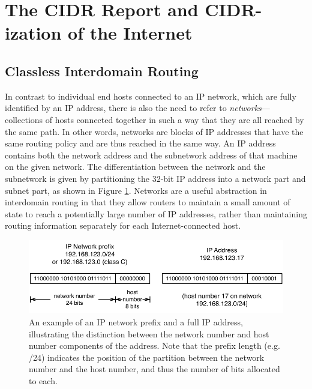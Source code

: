 %
%
%

\section{The CIDR Report and CIDR-ization of the Internet}


\subsection{Classless Interdomain Routing}

In contrast to individual end hosts connected to an IP network, which are fully
identified by an IP address, there is also the need to refer to
\emph{networks}---collections of hosts connected together in such a way that
they are all reached by the same path. In other words, networks are blocks of
IP addresses that have the same routing policy and are thus reached in the same
way. An IP address contains both the network address and the subnetwork address
of that machine on the given network. The differentiation between the network
and the subnetwork is given by partitioning the 32-bit IP address into a
network part and subnet part, as shown in Figure \ref{fig:ip_prefix_address}.
Networks are a useful abstraction in interdomain routing in that they allow
routers to maintain a small amount of state to reach a potentially large number
of IP addresses, rather than maintaining routing information separately for
each Internet-connected host.

\begin{figure}[h]
\begin{centering}
    \includegraphics[width=6in]{static_figures/prefix_address.pdf}
    \caption[An example of an IP network prefix and a full IP address]{An
    example of an IP network prefix and a full IP address, illustrating the
    distinction between the network number and host number components of the
    address. Note that the prefix length (e.g. /24) indicates the position of
    the partition between the network number and the host number, and thus the
    number of bits allocated to each.}
    \label{fig:ip_prefix_address}
\end{centering}
\end{figure}

